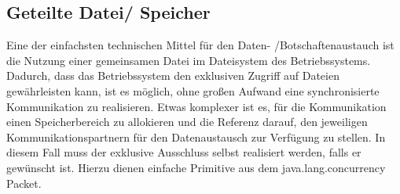 \documentclass[12pt,oneside,a4paper,bibtotoc,liststotoc]{scrreprt}
\begin{document}
\subsection{Geteilte Datei/ Speicher}
Eine der einfachsten technischen Mittel für den Daten- /Botschaftenaustauch ist die Nutzung einer gemeinsamen Datei im Dateisystem des Betriebssystems. Dadurch, dass das Betriebssystem den exklusiven Zugriff auf Dateien gewährleisten kann, ist es möglich, ohne großen Aufwand eine synchronisierte Kommunikation zu realisieren. Etwas komplexer ist es, für die Kommunikation einen Speicherbereich zu allokieren und die Referenz darauf, den jeweiligen Kommunikationspartnern für den Datenaustausch zur Verfügung zu stellen. In diesem Fall muss der exklusive Ausschluss selbst realisiert werden, falls er gewünscht ist. Hierzu dienen einfache Primitive aus dem java.lang.concurrency Packet.
\end{document}
